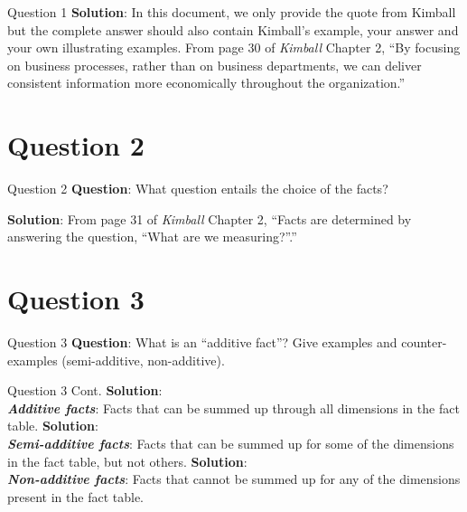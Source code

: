 \begin{frame}[fragile]{Question 1}
\textbf{Solution}: In this document, we only provide the quote from Kimball but the complete answer should also contain Kimball's example, your answer and your own illustrating examples. From page 30 of \textit{Kimball} Chapter 2, ``By focusing on business processes, rather than on business departments, we can deliver consistent information more economically throughout the organization.''
\\ \vspace{10pt}

\end{frame}

\section*{Question 2}

\begin{frame}[fragile]{Question 2}
\textbf{Question}: What question entails the choice of the facts?\\\vspace{10pt}

\textbf{Solution}: From page 31 of \textit{Kimball} Chapter 2, ``Facts are determined by answering the question, ``What are we measuring?''.''
\end{frame}

\section*{Question 3}
\begin{frame}[fragile]{Question 3}
\textbf{Question}: What is an ``additive fact''? Give examples and counter-examples (semi-additive, non-additive).
\end{frame}

\begin{frame}[fragile]{Question 3 Cont.}
\textbf{Solution}:\\ \vspace{10pt}
\textbf{\textit{Additive facts}}: Facts that can be summed up through all dimensions in the fact table.
\textbf{Solution}:\\ \vspace{5pt}
\textbf{\textit{Semi-additive facts}}: Facts that can be summed up for some of the dimensions in the fact table, but not others.
\textbf{Solution}:\\ \vspace{5pt}
\textbf{\textit{Non-additive facts}}: Facts that cannot be summed up for any of the dimensions present in the fact table.
\end{frame}

